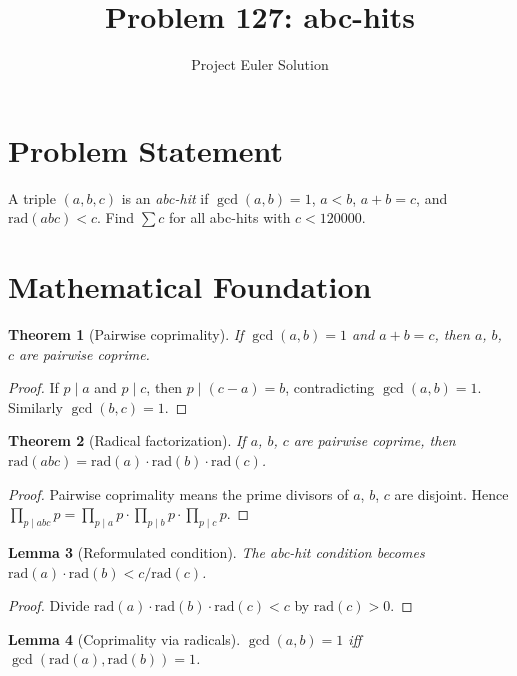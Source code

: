 \documentclass[11pt,a4paper]{article}
\title{Problem 127: abc-hits}
\author{Project Euler Solution}
\date{}
\newtheorem{theorem}{Theorem}
\newtheorem{lemma}[theorem]{Lemma}
\begin{document}
\maketitle

\section{Problem Statement}

A triple $(a, b, c)$ is an \emph{abc-hit} if $\gcd(a,b) = 1$, $a < b$, $a + b = c$, and $\mathrm{rad}(abc) < c$. Find $\sum c$ for all abc-hits with $c < 120000$.

\section{Mathematical Foundation}

\begin{theorem}[Pairwise coprimality]
If $\gcd(a,b) = 1$ and $a + b = c$, then $a$, $b$, $c$ are pairwise coprime.
\end{theorem}

\begin{proof}
If $p \mid a$ and $p \mid c$, then $p \mid (c - a) = b$, contradicting $\gcd(a,b) = 1$. Similarly $\gcd(b,c) = 1$.
\end{proof}

\begin{theorem}[Radical factorization]
If $a$, $b$, $c$ are pairwise coprime, then $\mathrm{rad}(abc) = \mathrm{rad}(a) \cdot \mathrm{rad}(b) \cdot \mathrm{rad}(c)$.
\end{theorem}

\begin{proof}
Pairwise coprimality means the prime divisors of $a$, $b$, $c$ are disjoint. Hence $\prod_{p \mid abc} p = \prod_{p \mid a} p \cdot \prod_{p \mid b} p \cdot \prod_{p \mid c} p$.
\end{proof}

\begin{lemma}[Reformulated condition]
The abc-hit condition becomes $\mathrm{rad}(a) \cdot \mathrm{rad}(b) < c / \mathrm{rad}(c)$.
\end{lemma}

\begin{proof}
Divide $\mathrm{rad}(a) \cdot \mathrm{rad}(b) \cdot \mathrm{rad}(c) < c$ by $\mathrm{rad}(c) > 0$.
\end{proof}

\begin{lemma}[Coprimality via radicals]
$\gcd(a,b) = 1$ iff $\gcd(\mathrm{rad}(a), \mathrm{rad}(b)) = 1$.
\end{lemma}
\end{document}
